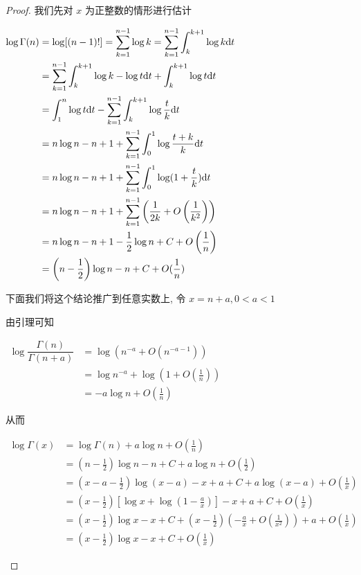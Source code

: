 \begin{proof}
	我们先对 $x$ 为正整数的情形进行估计

	\begin{center}
		$
		\begin{aligned}
			\log \Gamma(n)&=\log[(n-1)!]=\sum\limits_{k=1}^{n-1} \log k=\sum\limits_{k=1}^{n-1}\int_k^{k+1}\log k \text {d} t \\
			&=\sum\limits_{k=1}^{n-1}\int_k^{k+1}\log k -\log t \text {d} t+\int_k^{k+1} \log t \text {d} t \\
			&=\int_1^n \log t \text {d} t-\sum\limits_{k=1}^{n-1}\int_{k}^{k+1}\log \dfrac{t}{k}\text {d} t \\
			&=n\log n-n+1+\sum\limits_{k=1}^{n-1}\int_0^1 \log \dfrac{t+k}{k}\text {d} t \\
			&=n \log n -n+1 +\sum\limits_{k=1}^{n-1} \int_0^1 \log(1+\dfrac t k)\text {d} t \\
			&=n \log n-n+1+\sum\limits_{k=1}^{n-1}\left(\dfrac 1 {2k}+O\left(\dfrac 1 {k^2}\right)\right) \\
			&=n\log n-n+1 - \dfrac 1 2 \log n + C + O\left(\dfrac 1 n\right) \\
			&=\left(n-\frac 1 2 \right)\log n -n + C +O(\frac 1 n)
		\end{aligned}
		$
	\end{center}

	下面我们将这个结论推广到任意实数上, 令 $x=n+a, 0<a<1$

	由引理可知

	\begin{center}
		$
		\begin{aligned}
			\log \dfrac{\Gamma(n)}{\Gamma(n+a)} &= \log(n^{-a}+O(n^{-a-1})) \\
			&= \log n^{-a} + \log\left(1+O\left(\frac 1 n\right)\right)\\
			&=-a \log n+O\left(\frac 1 n\right)
		\end{aligned}
		$
	\end{center}

	从而

	\begin{center}
		$
		\begin{aligned}
			\log \Gamma(x)&=\log \Gamma(n)+a \log n + O\left(\frac 1 n\right)\\
			&=(n-\frac 1 2)\log n -n +C + a\log n + O\left(\frac 1 2\right) \\
			&=(x-a-\frac 1 2)\log (x-a)-x+a+C+a\log (x-a) +O\left(\frac 1 x\right) \\
			&=(x-\frac 1 2)[\log x +\log (1-\frac a x)]-x+a+C+O\left(\frac 1 x\right)\\
			&=(x-\frac 1 2)\log x-x+C+(x-\frac 1 2)\left(-\frac a x+O\left(\frac 1 {x^2}\right)\right)+a+O\left(\frac 1 x\right) \\
			&=(x-\frac 1 2)\log x -x +C +O\left(\frac 1 x\right)
		\end{aligned}
		$
	\end{center}


\end{proof}
